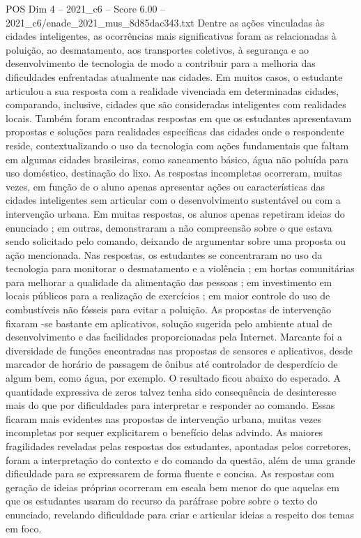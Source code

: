 \begin{textsample}{POS Dim 4 – 2021\_c6 – Score 6.00 – 2021\_c6/enade\_2021\_mus\_8d85dac343.txt}
Dentre as ações vinculadas às cidades inteligentes, as ocorrências mais significativas foram as relacionadas à poluição, ao desmatamento, aos transportes coletivos, à segurança e ao desenvolvimento de tecnologia de modo a contribuir para a melhoria das dificuldades enfrentadas atualmente nas cidades.
Em muitos casos, o estudante articulou a sua resposta com a realidade vivenciada em determinadas cidades, comparando, inclusive, cidades que são consideradas inteligentes com realidades locais.
Também foram encontradas respostas em que os estudantes apresentavam propostas e soluções para realidades específicas das cidades onde o respondente reside, contextualizando o uso da tecnologia com ações fundamentais que faltam em algumas cidades brasileiras, como saneamento básico, água não poluída para uso doméstico, destinação do lixo.
As respostas incompletas ocorreram, muitas vezes, em função de o aluno apenas apresentar ações ou características das cidades inteligentes sem articular com o desenvolvimento sustentável ou com a intervenção urbana.
Em muitas respostas, os alunos apenas repetiram ideias do enunciado ; em outras, demonstraram a não compreensão sobre o que estava sendo solicitado pelo comando, deixando de argumentar sobre uma proposta ou ação mencionada.
Nas respostas, os estudantes se concentraram no uso da tecnologia para monitorar o desmatamento e a violência ; em hortas comunitárias para melhorar a qualidade da alimentação das pessoas ; em investimento em locais públicos para a realização de exercícios ; em maior controle do uso de combustíveis não fósseis para evitar a poluição.
As propostas de intervenção fixaram -se bastante em aplicativos, solução sugerida pelo ambiente atual de desenvolvimento e das facilidades proporcionadas pela Internet.
Marcante foi a diversidade de funções encontradas nas propostas de sensores e aplicativos, desde marcador de horário de passagem de ônibus até controlador de desperdício de algum bem, como água, por exemplo.
O resultado ficou abaixo do esperado.
A quantidade expressiva de zeros talvez tenha sido consequência de desinteresse mais do que por dificuldades para interpretar e responder ao comando.
Essas ficaram mais evidentes nas propostas de intervenção urbana, muitas vezes incompletas por sequer explicitarem o benefício delas advindo.
As maiores fragilidades reveladas pelas respostas dos estudantes, apontadas pelos corretores, foram a interpretação do contexto e do comando da questão, além de uma grande dificuldade para se expressarem de forma fluente e concisa.
As respostas com geração de ideias próprias ocorreram em escala bem menor do que aquelas em que os estudantes usaram do recurso da paráfrase pobre sobre o texto do enunciado, revelando dificuldade para criar e articular ideias a respeito dos temas em foco.

\end{textsample}
